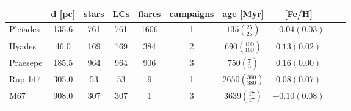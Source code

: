 \begin{tabular}{lccccccccr}
\hline
          &  d [pc] &  stars &  LCs &  flares &  campaigns &                        age [Myr] &         [Fe/H] \\
\hline
 Pleiades &   135.6 &    761 &  761 &    1606 &          1 &     $135\left(_{25}^{25}\right)$ &  $-0.04(0.03)$ \\
   Hyades &    46.0 &    169 &  169 &     384 &          2 &   $690\left(_{160}^{100}\right)$ &   $0.13(0.02)$ \\
 Praesepe &   185.5 &    964 &  964 &     906 &          3 &       $750\left(_{3}^{7}\right)$ &   $0.16(0.00)$ \\
  Rup 147 &   305.0 &     53 &   53 &       9 &          1 &  $2650\left(_{380}^{380}\right)$ &   $0.08(0.07)$ \\
      M67 &   908.0 &    307 &  307 &       1 &          3 &    $3639\left(_{17}^{17}\right)$ &  $-0.10(0.08)$ \\
\hline

\end{tabular}
